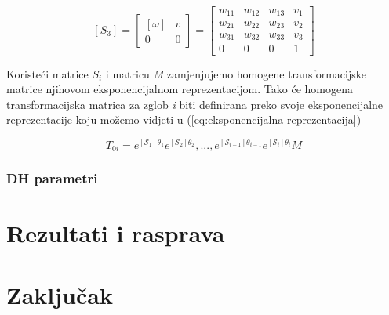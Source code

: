 \documentclass[times, utf8, diplomskirad]{fer}
\begin{document}
\begin{equation}
    \left[S_3\right]=\left[\begin{array}{cc}
    [\omega] & v \\
    0 & 0
\end{array}\right]=
    \left[\begin{array}{cccc}
        w_{11} & w_{12} & w_{13} & v_1 \\
        w_{21} & w_{22} & w_{23} & v_2 \\
        w_{31} & w_{32} & w_{33} & v_3 \\
        0 & 0 & 0 & 1
    \end{array}\right]
    \label{eq:s-matrica-se3}
\end{equation}

Koristeći matrice \textit{$S_i$} i matricu \textit{M} zamjenjujemo homogene transformacijske matrice njihovom eksponencijalnom reprezentacijom.
Tako će homogena transformacijska matrica za zglob \textit{i} biti definirana preko svoje eksponencijalne reprezentacije koju možemo vidjeti u (\ref{eq:eksponencijalna-reprezentacija})

\begin{equation}
     T_{0i}=e^{\left[\mathcal{S}_{1}\right] \theta_{1}}  e^{\left[\mathcal{S}_{2}\right] \theta_{2}} , ..., e^{\left[\mathcal{S}_{i-1}\right] \theta_{i-1}} e^{\left[\mathcal{S}_{i}\right] \theta_{i}} M
    \label{eq:eksponencijalna-reprezentacija}
\end{equation}

\subsection{DH parametri}

\chapter{Rezultati i rasprava}
\label{pog:rezultati_i_rasprava}



\chapter{Zaključak}
\label{pog:zakljucak}



\end{document}
